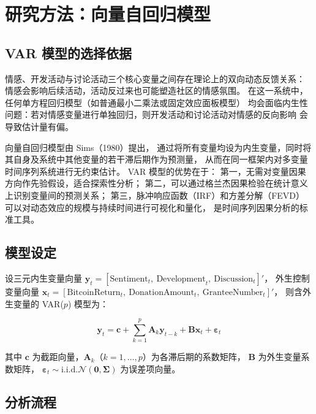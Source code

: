 \documentclass[
    type = master, %
    degree = professional,        %
    decl-page,  %
    twoside,                %
    fontset = fandol %
  ]{njuthesis}
\begin{document}
\section{研究方法：向量自回归模型}

\subsection{VAR 模型的选择依据}

情感、开发活动与讨论活动三个核心变量之间存在理论上的双向动态反馈关系：
情感会影响后续活动，活动反过来也可能塑造社区的情感氛围。
在这一系统中，任何单方程回归模型（如普通最小二乘法或固定效应面板模型）
均会面临内生性问题：若对情感变量进行单独回归，则开发活动和讨论活动对情感的反向影响
会导致估计量有偏。

向量自回归模型由 Sims（1980）\cite{sims1980macroeconomics}提出，
通过将所有变量均设为内生变量，同时将其自身及系统中其他变量的若干滞后期作为预测量，
从而在同一框架内对多变量时间序列系统进行无约束估计。
VAR 模型的优势在于：
第一，无需对变量因果方向作先验假设，适合探索性分析；
第二，可以通过格兰杰因果检验\cite{granger1969investigating}在统计意义上识别变量间的预测关系；
第三，脉冲响应函数（IRF）和方差分解（FEVD）
可以对动态效应的规模与持续时间进行可视化和量化，
是时间序列因果分析的标准工具。

\subsection{模型设定}

设三元内生变量向量
$\mathbf{y}_t = [\text{Sentiment}_t,\ \text{Development}_t,\ \text{Discussion}_t]'$，
外生控制变量向量
$\mathbf{x}_t = [\text{BitcoinReturn}_t,\ \text{DonationAmount}_t,\ \text{GranteeNumber}_t]'$，
则含外生变量的 VAR($p$) 模型为：

\begin{equation}
\label{eq:var-model}
\mathbf{y}_t = \mathbf{c} + \sum_{k=1}^{p} \mathbf{A}_k \mathbf{y}_{t-k}
+ \mathbf{B} \mathbf{x}_t + \boldsymbol{\varepsilon}_t
\end{equation}

其中 $\mathbf{c}$ 为截距向量，$\mathbf{A}_k$（$k=1,\ldots,p$）为各滞后期的系数矩阵，
$\mathbf{B}$ 为外生变量系数矩阵，
$\boldsymbol{\varepsilon}_t \sim \text{i.i.d.} \mathcal{N}(\mathbf{0}, \boldsymbol{\Sigma})$
为误差项向量。

\subsection{分析流程}
\end{document}
